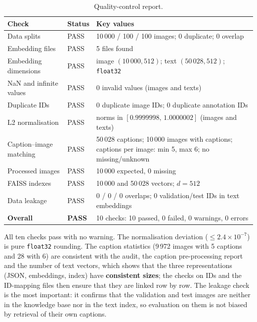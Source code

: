 \documentclass[11pt,a4paper]{article}
\renewcommand{\_}{\textunderscore\allowbreak{}}
\newcommand{\code}[1]{\texttt{#1}}
\begin{document}
\begin{table}[H]
\centering
\small
\begin{tabular}{@{}llp{7.8cm}@{}}
\toprule
\textbf{Check} & \textbf{Status} & \textbf{Key values}\\
\midrule
Data splits & PASS & 10\,000 / 100 / 100 images; 0 duplicate; 0 overlap\\
Embedding files & PASS & 5 files found\\
Embedding dimensions & PASS & image $(10\,000,512)$; text $(50\,028,512)$; \code{float32}\\
NaN and infinite values & PASS & 0 invalid values (images and texts)\\
Duplicate IDs & PASS & 0 duplicate image IDs; 0 duplicate annotation IDs\\
L2 normalisation & PASS & norms in $[0.9999998,\,1.0000002]$ (images and texts)\\
Caption--image matching & PASS & 50\,028 captions; 10\,000 images with captions; captions per image: min 5, max 6; no missing/unknown\\
Processed images & PASS & 10\,000 expected, 0 missing\\
FAISS indexes & PASS & 10\,000 and 50\,028 vectors; $d=512$\\
Data leakage & PASS & 0 / 0 / 0 overlaps; 0 validation/test IDs in text embeddings\\
\midrule
\textbf{Overall} & \textbf{PASS} & 10 checks: 10 passed, 0 failed, 0 warnings, 0 errors\\
\bottomrule
\end{tabular}
\caption{Quality-control report.}
\label{tab:qc}
\end{table}

\begin{interp}
All ten checks pass with no warning. The normalisation deviation ($\le 2.4\times10^{-7}$) is pure \code{float32} rounding. The caption statistics (9\,972 images with 5 captions and 28 with 6) are consistent with the audit, the caption pre-processing report and the number of text vectors, which shows that the three representations (JSON, embeddings, index) have \textbf{consistent sizes}; the checks on IDs and the ID-mapping files then ensure that they are linked row by row. The leakage check is the most important: it confirms that the validation and test images are neither in the knowledge base nor in the text index, so evaluation on them is not biased by retrieval of their own captions.
\end{interp}
\end{document}
